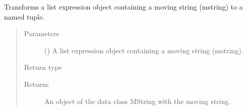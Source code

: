 \documentclass[letterpaper,10pt,english]{sphinxmanual}
\begin{document}

\begin{fulllineitems}
\label{\detokenize{index:secondodb.api.algebras.secondospatiotemporalalgebra.parse_mstring}}
Transforms a list expression object containing a moving string (mstring) to a named tuple.
\begin{quote}\begin{description}
\item[{Parameters}] \leavevmode
{} () \textendash{} A list expression object containing a moving string (mstring).

\item[{Return type}] \leavevmode
{\hyperref[\detokenize{index:secondodb.api.algebras.secondospatiotemporalalgebra.MString}]{}}

\item[{Returns}] \leavevmode
An object of the data class MString with the moving string.

\end{description}\end{quote}

\end{fulllineitems}

\end{document}
